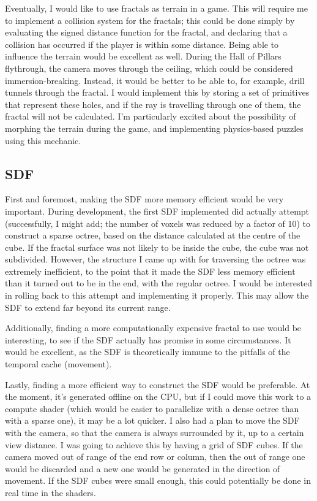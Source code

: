 Eventually, I would like to use fractals as terrain in a game. This will require me to implement a collision system for the fractals; this could be done simply by evaluating the signed distance function for the fractal, and declaring that a collision has occurred if the player is within some distance. Being able to influence the terrain would be excellent as well. During the Hall of Pillars flythrough, the camera moves through the ceiling, which could be considered immersion-breaking. Instead, it would be better to be able to, for example, drill tunnels through the fractal. I would implement this by storing a set of primitives that represent these holes, and if the ray is travelling through one of them, the fractal will not be calculated. I'm particularly excited about the possibility of morphing the terrain during the game, and implementing physics-based puzzles using this mechanic.

\subsection{SDF}

First and foremost, making the SDF more memory efficient would be very important. During development, the first SDF implemented did actually attempt (successfully, I might add; the number of voxels was reduced by a factor of 10) to construct a sparse octree, based on the distance calculated at the centre of the cube. If the fractal surface was not likely to be inside the cube, the cube was not subdivided. However, the structure I came up with for traversing the octree was extremely inefficient, to the point that it made the SDF less memory efficient than it turned out to be in the end, with the regular octree. I would be interested in rolling back to this attempt and implementing it properly. This may allow the SDF to extend far beyond its current range.\newline

Additionally, finding a more computationally expensive fractal to use would be interesting, to see if the SDF actually has promise in some circumstances. It would be excellent, as the SDF is theoretically immune to the pitfalls of the temporal cache (movement).\newline

Lastly, finding a more efficient way to construct the SDF would be preferable. At the moment, it's generated offline on the CPU, but if I could move this work to a compute shader (which would be easier to parallelize with a dense octree than with a sparse one), it may be a lot quicker. I also had a plan to move the SDF with the camera, so that the camera is always surrounded by it, up to a certain view distance. I was going to achieve this by having a grid of SDF cubes. If the camera moved out of range of the end row or column, then the out of range one would be discarded and a new one would be generated in the direction of movement. If the SDF cubes were small enough, this could potentially be done in real time in the shaders.\newline

